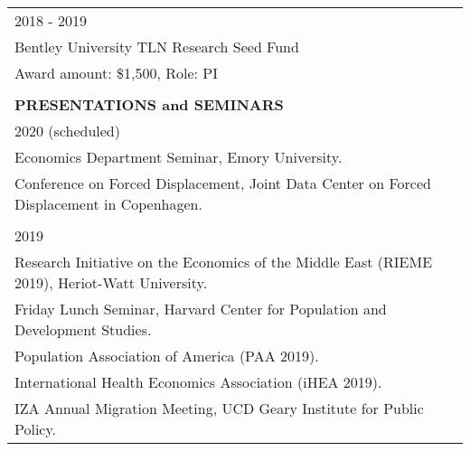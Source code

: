 \documentclass[12 pt]{article}
\begin{document}
\begin{longtable}{ccccc}
\\
 \multicolumn{4}{l}{2018 - 2019} \\
 \multicolumn{4}{l}{Bentley University TLN Research Seed Fund} \\
\multicolumn{4}{l}{Award amount: \$1,500, Role: PI}  \\
\\


 

 \multicolumn{5}{l}{\textbf{PRESENTATIONS and SEMINARS}}\\[2 pt]
 
   \multicolumn{5}{l}{2020 (scheduled)}\\
  \multicolumn{5}{l}{Economics Department Seminar, Emory University.} \\ 
    \multicolumn{5}{l}{Conference on Forced Displacement, Joint Data Center on Forced Displacement in Copenhagen.} \\ 
  \\

  \multicolumn{5}{l}{2019}\\
    \multicolumn{5}{l}{Research Initiative on the Economics of the Middle East (RIEME 2019), Heriot-Watt University.} \\
   \multicolumn{5}{l}{Friday Lunch Seminar, Harvard Center for Population and Development Studies.} \\
 \multicolumn{5}{l}{Population Association of America (PAA 2019).} \\
  \multicolumn{5}{l}{International Health Economics Association (iHEA 2019).} \\
    \multicolumn{5}{l}{IZA Annual Migration Meeting, UCD Geary Institute for Public Policy.} \\


\end{longtable}
\end{document}
